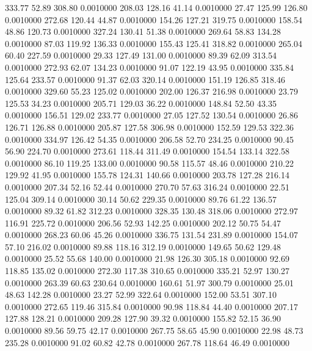  333.77   52.89  308.80   0.0010000
 208.03  128.16   41.14   0.0010000
  27.47  125.99  126.80   0.0010000
 272.68  120.44   44.87   0.0010000
 154.26  127.21  319.75   0.0010000
 158.54   48.86  120.73   0.0010000
 327.24  130.41   51.38   0.0010000
 269.64   58.83  134.28   0.0010000
  87.03  119.92  136.33   0.0010000
 155.43  125.41  318.82   0.0010000
 265.04   60.40  227.59   0.0010000
  29.33  127.49  131.00   0.0010000
  89.39   62.09  313.54   0.0010000
 272.93   62.07  134.23   0.0010000
  91.07  122.19   43.95   0.0010000
 335.84  125.64  233.57   0.0010000
  91.37   62.03  320.14   0.0010000
 151.19  126.85  318.46   0.0010000
 329.60   55.23  125.02   0.0010000
 202.00  126.37  216.98   0.0010000
  23.79  125.53   34.23   0.0010000
 205.71  129.03   36.22   0.0010000
 148.84   52.50   43.35   0.0010000
 156.51  129.02  233.77   0.0010000
  27.05  127.52  130.54   0.0010000
  26.86  126.71  126.88   0.0010000
 205.87  127.58  306.98   0.0010000
 152.59  129.53  322.36   0.0010000
 334.97  126.42   54.35   0.0010000
 206.58   52.70  234.25   0.0010000
  90.45   56.90  224.70   0.0010000
 273.61  118.44  311.49   0.0010000
 154.54  133.14  322.58   0.0010000
  86.10  119.25  133.00   0.0010000
  90.58  115.57   48.46   0.0010000
 210.22  129.92   41.95   0.0010000
 155.78  124.31  140.66   0.0010000
 203.78  127.28  216.14   0.0010000
 207.34   52.16   52.44   0.0010000
 270.70   57.63  316.24   0.0010000
  22.51  125.04  309.14   0.0010000
  30.14   50.62  229.35   0.0010000
  89.76   61.22  136.57   0.0010000
  89.32   61.82  312.23   0.0010000
 328.35  130.48  318.06   0.0010000
 272.97  116.91  225.72   0.0010000
 206.56   52.93  142.25   0.0010000
 202.12   50.75   54.47   0.0010000
 268.23   60.06   45.26   0.0010000
 336.75  131.54  231.89   0.0010000
 154.07   57.10  216.02   0.0010000
  89.88  118.16  312.19   0.0010000
 149.65   50.62  129.48   0.0010000
  25.52   55.68  140.00   0.0010000
  21.98  126.30  305.18   0.0010000
  92.69  118.85  135.02   0.0010000
 272.30  117.38  310.65   0.0010000
 335.21   52.97  130.27   0.0010000
 263.39   60.63  230.64   0.0010000
 160.61   51.97  300.79   0.0010000
  25.01   48.63  142.28   0.0010000
  23.27   52.99  322.64   0.0010000
 152.00   53.51  307.10   0.0010000
 272.65  119.46  315.84   0.0010000
  90.98  118.84   44.40   0.0010000
 207.17  127.88  128.21   0.0010000
 209.28  127.90   39.32   0.0010000
 155.82   52.15   36.90   0.0010000
  89.56   59.75   42.17   0.0010000
 267.75   58.65   45.90   0.0010000
  22.98   48.73  235.28   0.0010000
  91.02   60.82   42.78   0.0010000
 267.78  118.64   46.49   0.0010000
